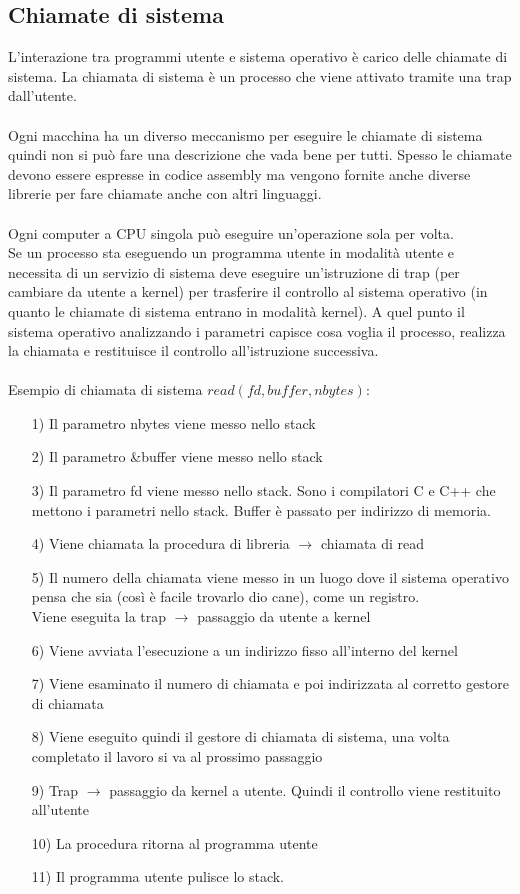 \documentclass{article}
\begin{document}
\subsection{Chiamate di sistema}
L'interazione tra programmi utente e sistema operativo è carico delle chiamate di sistema. La chiamata di sistema è un processo che viene attivato tramite una trap dall'utente.
\\
\\Ogni macchina ha un diverso meccanismo per eseguire le chiamate di sistema quindi non si può fare una descrizione che vada bene per tutti. Spesso le chiamate devono essere espresse 
in codice assembly ma vengono fornite anche diverse librerie per fare chiamate anche con altri linguaggi.
\\
\\
Ogni computer a CPU singola può eseguire un'operazione sola per volta. 
\\
Se un processo sta eseguendo un programma utente in modalità utente e necessita di un servizio di sistema deve 
eseguire un'istruzione di trap (per cambiare da utente a kernel) per trasferire il controllo al sistema operativo (in quanto le chiamate di sistema entrano in modalità kernel). A quel punto 
il sistema operativo analizzando i parametri capisce cosa voglia il processo, realizza la chiamata e restituisce il controllo all'istruzione successiva.
\\
\\
Esempio di chiamata di sistema $read(fd,buffer,nbytes)$:
\begin{enumerate}
   \item[1)] Il parametro nbytes viene messo nello stack 
   \item[2)] Il parametro \&buffer viene messo nello stack 
   \item[3)] Il parametro fd viene messo nello stack. Sono i compilatori C e C++ che 
      mettono i parametri nello stack. Buffer è passato per indirizzo di memoria. 
   \item[4)] Viene chiamata la procedura di libreria $\rightarrow$ chiamata di read
   \item[5)] Il numero della chiamata viene messo in un luogo dove il sistema operativo pensa che sia (così è facile trovarlo dio cane), come un registro. 
      \\Viene eseguita la trap $\rightarrow$ passaggio da utente a kernel 
   \item[6)] Viene avviata l'esecuzione a un indirizzo fisso all'interno del kernel
   \item[7)] Viene esaminato il numero di chiamata e poi indirizzata al corretto gestore di chiamata 
   \item[8)] Viene eseguito quindi il gestore di chiamata di sistema, una volta completato il lavoro si va al prossimo passaggio 
   \item[9)] Trap $\rightarrow$ passaggio da kernel a utente. Quindi il controllo viene restituito all'utente 
   \item[10)] La procedura ritorna al programma utente 
   \item[11)] Il programma utente pulisce lo stack.
\end{enumerate}
\end{document}
